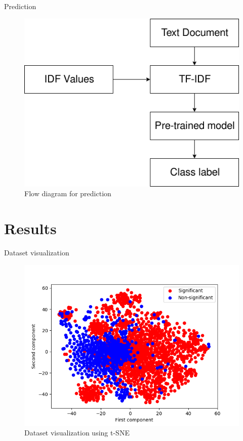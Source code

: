 \documentclass[12pt]{beamer}
\begin{document}
\begin{frame}{Prediction}
    \begin{figure}[h]
        \includegraphics[scale=0.4]{images/prediction.png}
        \caption{Flow diagram for prediction}
        \label{fig:prediction}
    \end{figure}
\end{frame}
\section{Results}

\begin{frame}{Dataset visualization}
\begin{figure}[h]
    \includegraphics[scale=0.5]{images/data_visualization.png}
    \caption{Dataset visualization using t-SNE}
    \label{fig:dataset}
\end{figure}
\end{frame}
\end{document}
